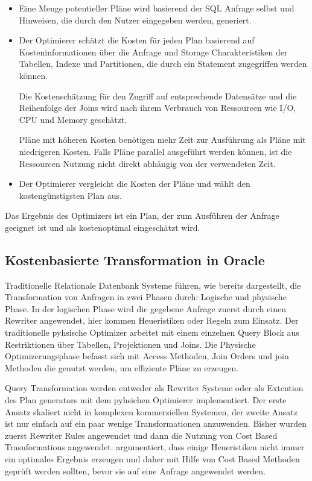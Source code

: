 \begin{itemize}
\item Eine Menge potentieller Pläne wird basierend der SQL Anfrage selbst und Hinweisen, die durch den Nutzer eingegeben werden, generiert.
\item Der Optimierer schätzt die Kosten für jeden Plan basierend auf Kosteninformationen über die Anfrage und Storage Charakteristiken der Tabellen, Indexe und Partitionen, die durch ein Statement zugegriffen werden können.

Die Kostenschätzung für den Zugriff auf entsprechende Datensätze und die Reihenfolge der Joins wird nach ihrem Verbrauch von Ressourcen wie I/O, CPU und Memory geschätzt.

Pläne mit höheren Kosten benötigen mehr Zeit zur Ausführung als Pläne mit niedrigeren Kosten. Falls Pläne parallel ausgeführt werden können, ist die Ressourcen Nutzung nicht direkt abhängig von der verwendeten Zeit.

\item Der Optimierer vergleicht die Kosten der Pläne und wählt den kostengünstigsten Plan aus.
\end{itemize}

Das Ergebnis des Optimizers ist ein Plan, der zum Ausführen der Anfrage geeignet ist und als kostenoptimal eingeschätzt wird.


\subsection{Kostenbasierte Transformation in Oracle}

Traditionelle Relationale Datenbank Systeme führen, wie bereits dargestellt, die Transformation von Anfragen in zwei Phasen durch: Logische und physische Phase. In der logischen Phase wird die gegebene Anfrage zuerst durch einen Rewriter angewendet, hier kommen Heueristiken oder Regeln zum Einsatz. Der traditionelle pyhsische Optimizer arbeitet mit einem einzelnen Query Block aus Restriktionen über Tabellen, Projektionen und Joins. Die Physische Optimizerungsphase befasst sich mit Access Methoden, Join Orders und join Methoden die genutzt werden, um effiziente Pläne zu erzeugen.

Query Transformation werden entweder als Rewriter Systeme oder als Extention des Plan generators mit dem pyhsichen Optimierer implementiert. Der erste Ansatz skaliert nicht in komplexen kommerziellen Systemen, der zweite Ansatz ist nur einfach auf ein paar wenige Transformationen anzuwenden. 
Bisher wurden zuerst Rewriter Rules angewendet und dann die Nutzung von Cost Based Trasnformations angewendet. \cite{ahmed2006cost} argumentiert, dass einige Heueristiken nicht immer ein optimales Ergebnis erzeugen und daher mit Hilfe von Cost Based Methoden geprüft werden sollten, bevor sie auf eine Anfrage angewendet werden.


